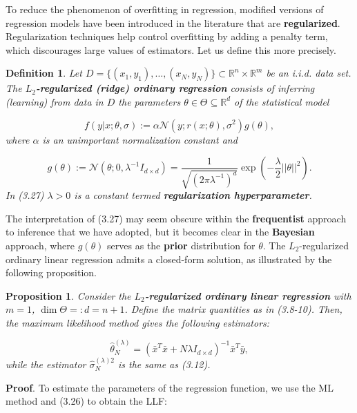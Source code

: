 \documentclass{report}
\newtheorem{definition}{Definition}[chapter]
\newtheorem{proposition}{Proposition}[chapter]
\begin{document}
To reduce the phenomenon of overfitting in regression, modified versions of regression models have been introduced in the literature that are \textbf{regularized}. Regularization techniques help control overfitting by adding a penalty term, which discourages large values of estimators. Let us define this more precisely.

\begin{definition}
Let $D = \{(x_1,y_1),\dots,(x_N,y_N)\} \subset \mathbb{R}^n \times \mathbb{R}^m$ be an i.i.d. data set. The \textbf{$L_2$-regularized (ridge) ordinary regression} consists of inferring (learning) from data in $D$ the parameters $\theta \in \Theta \subseteq \mathbb{R}^d$ of the statistical model

\begin{equation}
f(y|x;\theta,\sigma) := \alpha\mathcal{N}(y;r(x;\theta),\sigma^2)g(\theta),
\end{equation}
where $\alpha$ is an unimportant normalization constant and

\begin{equation}
g(\theta) := \mathcal{N}(\theta;0,\lambda^{-1}I_{d\times d}) = \frac{1}{\sqrt{(2\pi\lambda^{-1})^d}}\exp\left(-\frac{\lambda}{2}||\theta||^2\right).
\end{equation}
In (3.27) $\lambda > 0$ is a constant termed \textbf{regularization hyperparameter}.
\end{definition}
The interpretation of (3.27) may seem obscure within the \textbf{frequentist} approach to inference that we have adopted, but it becomes clear in the \textbf{Bayesian} approach, where $g(\theta)$ serves as the \textbf{prior} distribution for $\theta$. The $L_2$-regularized ordinary linear regression admits a closed-form solution, as illustrated by the following proposition.

\begin{proposition}
Consider the \textbf{$L_2$-regularized ordinary linear regression} with $m=1$, $\dim \Theta =: d = n + 1$. Define the matrix quantities as in (3.8-10). Then, the maximum likelihood method gives the following estimators:

\begin{equation}
\hat{\theta}_N^{(\lambda)} = (\bar{x}^T\bar{x} +N\lambda I_{d\times d})^{-1}\bar{x}^T\bar{y},
\end{equation}
while the estimator $\hat{\sigma}_N^{(\lambda)2}$ is the same as (3.12).
\end{proposition}
\textbf{Proof}. To estimate the parameters of the regression function, we use the ML method and (3.26) to obtain the LLF:
\end{document}
